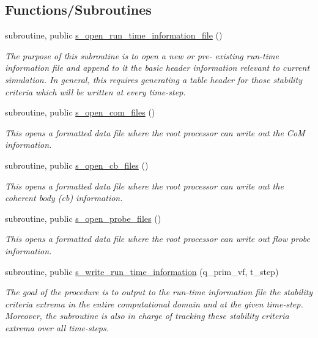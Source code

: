 \subsection*{Functions/\+Subroutines}
\begin{DoxyCompactItemize}
\item 
subroutine, public \hyperlink{namespacem__data__output_a050b4b01f11c1d352f55b46b6514634d}{s\+\_\+open\+\_\+run\+\_\+time\+\_\+information\+\_\+file} ()
\begin{DoxyCompactList}\small\item\em The purpose of this subroutine is to open a new or pre-\/ existing run-\/time information file and append to it the basic header information relevant to current simulation. In general, this requires generating a table header for those stability criteria which will be written at every time-\/step. \end{DoxyCompactList}\item 
subroutine, public \hyperlink{namespacem__data__output_a36714d4cf746d5beb2736752fdd6d747}{s\+\_\+open\+\_\+com\+\_\+files} ()
\begin{DoxyCompactList}\small\item\em This opens a formatted data file where the root processor can write out the CoM information. \end{DoxyCompactList}\item 
subroutine, public \hyperlink{namespacem__data__output_a411af1336ca1bc899d3b7352d9383a81}{s\+\_\+open\+\_\+cb\+\_\+files} ()
\begin{DoxyCompactList}\small\item\em This opens a formatted data file where the root processor can write out the coherent body (cb) information. \end{DoxyCompactList}\item 
subroutine, public \hyperlink{namespacem__data__output_af469c3d867d96eb1ca255832e586ec97}{s\+\_\+open\+\_\+probe\+\_\+files} ()
\begin{DoxyCompactList}\small\item\em This opens a formatted data file where the root processor can write out flow probe information. \end{DoxyCompactList}\item 
subroutine, public \hyperlink{namespacem__data__output_a33a72559ec5cfdedf7162a8269d41201}{s\+\_\+write\+\_\+run\+\_\+time\+\_\+information} (q\+\_\+prim\+\_\+vf, t\+\_\+step)
\begin{DoxyCompactList}\small\item\em The goal of the procedure is to output to the run-\/time information file the stability criteria extrema in the entire computational domain and at the given time-\/step. Moreover, the subroutine is also in charge of tracking these stability criteria extrema over all time-\/steps. \end{DoxyCompactList}\item 

\end{DoxyCompactItemize}
